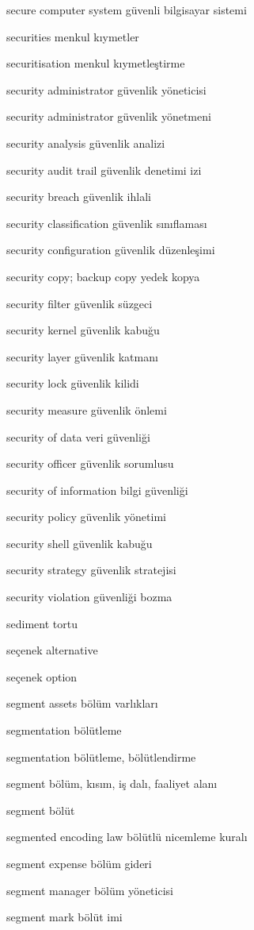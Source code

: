 \documentclass[12pt,fleqn]{article}\usepackage{../../common}
\begin{document}
secure computer system güvenli bilgisayar sistemi

securities menkul kıymetler

securitisation menkul kıymetleştirme

security administrator güvenlik yöneticisi

security administrator güvenlik yönetmeni

security analysis güvenlik analizi

security audit trail güvenlik denetimi izi

security breach güvenlik ihlali

security classification güvenlik sınıflaması

security configuration güvenlik düzenleşimi

security copy; backup copy yedek kopya

security filter güvenlik süzgeci

security kernel güvenlik kabuğu

security layer güvenlik katmanı

security lock güvenlik kilidi

security measure güvenlik önlemi

security of data veri güvenliği

security officer güvenlik sorumlusu

security of information bilgi güvenliği

security policy güvenlik yönetimi

security shell güvenlik kabuğu

security strategy güvenlik stratejisi

security violation güvenliği bozma

sediment tortu

seçenek alternative

seçenek option

segment assets bölüm varlıkları

segmentation bölütleme

segmentation bölütleme, bölütlendirme

segment bölüm, kısım, iş dalı, faaliyet alanı

segment bölüt

segmented encoding law bölütlü nicemleme kuralı

segment expense bölüm gideri

segment manager bölüm yöneticisi

segment mark bölüt imi
\end{document}
